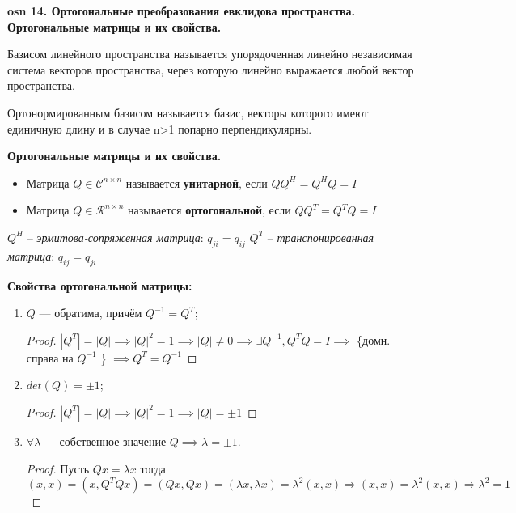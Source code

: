 \textbf{\LARGE osn 14. Ортогональные преобразования евклидова пространства. Ортогональные матрицы и их свойства.}

Базисом линейного пространства называется упорядоченная линейно независимая система векторов пространства, через которую линейно выражается любой вектор пространства. 

Ортонормированным базисом называется
базис, векторы которого имеют единичную длину и в случае n>1 попарно перпендикулярны. 

\textbf{Ортогональные матрицы и их свойства.}
\begin{itemize}
    \item Матрица $Q \in \mathcal{C}^{n \times n}$ называется \textbf{унитарной}, если \newline $QQ^H = Q^HQ=I$
    \item Матрица $Q \in \mathcal{R}^{n \times n}$ называется \textbf{ортогональной}, если \newline $QQ^T = Q^TQ=I$
 
\end{itemize}   

$Q^H$ -- \textit{эрмитова-сопряженная матрица}: $q_{ji} = \overline{q}_{ij}$   \newline
$Q^T$ -- \textit{транспонированная матрица}: $q_{ij} = q_{ji}$

\textbf{Свойства ортогональной матрицы:}
    \begin{enumerate}
        \item $Q$ --- обратима, причём $Q^{-1}=Q^T$;
        
        \begin{proof}
        $\left|Q^T\right|=\left|Q\right| \implies \left|Q\right|^2 = 1 \implies \left|Q\right| \neq 0 \implies \exists Q^{-1}, Q^TQ=I \implies$ \{домн. справа на $Q^{-1}$ \} $\implies Q^T=Q^{-1}$
        \end{proof}
        
        \item $det(Q) = \pm1$;
        
        \begin{proof}
        $\left|Q^T\right|=\left|Q\right| \implies \left|Q\right|^2 = 1 \implies \left|Q\right| = \pm 1$
        \end{proof}
        
        \item $\forall \lambda$ --- собственное значение $Q\implies \lambda=\pm1$.
        \begin{proof}
        Пусть $Qx=\lambda x$ тогда $(x,x)=(x,Q^TQx) = (Qx,Qx) = (\lambda x,\lambda x) = \lambda^2(x,x) \Rightarrow (x,x) = \lambda^2(x,x) \Rightarrow \lambda^2 = 1$

        \end{proof}
    \end{enumerate}
 
